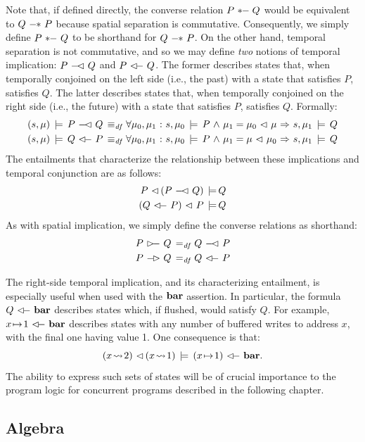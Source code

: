 \documentclass[11pt]{report}
\begin{document}
Note that, if defined directly, the converse relation $P \fsep\!\!\!\relbar Q$ would be equivalent to $Q \fsepi P$ because spatial separation is commutative. Consequently, we simply define $P \fsepic Q$ to be shorthand for $Q \fsepi P$. On the other hand, temporal separation is not commutative, and so we may define \emph{two} notions of temporal implication: $P \fseqli Q$ and $P \fseqri Q$. The former describes states that, when temporally conjoined on the left side (i.e., the past) with a state that satisfies $P$, satisfies $Q$. The latter describes states that, when temporally conjoined on the right side (i.e., the future) with a state that satisfies $P$, satisfies $Q$. Formally: \begin{align*} (s,\mu) \sentails P \fseqli Q \iffdef & \forall \mu_0,\mu_1 \st s,\mu_0 \sentails P \conj \mu_1 = \mu_0 \fseq \mu \onlyif  s,\mu_1 \sentails Q \\
(s,\mu) \sentails Q \fseqri P \iffdef & \forall \mu_0,\mu_1 \st s,\mu_0 \sentails P \conj \mu_1 = \mu \fseq \mu_0 \onlyif  s,\mu_1 \sentails Q \end{align*} The entailments that characterize the relationship between these implications and temporal conjunction are as follows: \begin{align*}
  P \fseq (P \fseqli Q) \sentails & Q \\ 
  (Q \fseqri P) \fseq P \sentails & Q \\ 
\end{align*} As with spatial implication, we simply define the converse relations as shorthand: \begin{align*}
  P \fseqlic Q \eqdef & Q \fseqli P \\
  P \fseqric Q \eqdef & Q \fseqri P \\
\end{align*}

The right-side temporal implication, and its characterizing entailment,  is especially useful when used with the $\mathbf{bar}$ assertion. In particular, the formula $Q \fseqri \fbaru$ describes states which, if flushed, would satisfy $Q$. For example, $x \fpointsto 1 \fseqri \fbaru$ describes states with any number of buffered writes to address $x$, with the final one having value 1. One consequence is that: \[(x \fwriteu 2) \fseq (x \fwriteu 1) \sentails (x \fpointsto 1) \fseqri \fbaru.\] The ability to express such sets of states will be of crucial importance to the program logic for concurrent programs described in the following chapter. 


\subsection{Algebra}
\label{sec:sequential-algebra}
\end{document}
